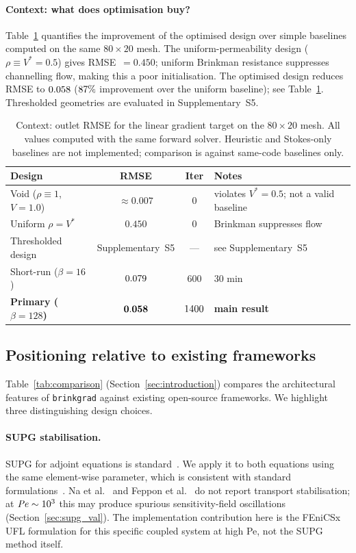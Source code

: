\paragraph{Context: what does optimisation buy?}
Table~\ref{tab:context} quantifies the improvement of the
optimised design over simple baselines computed on the
same $80\times20$ mesh.
The uniform-permeability design ($\rho\equiv V^*=0.5$)
gives RMSE~$=0.450$; uniform Brinkman resistance suppresses
channelling flow, making this a poor initialisation.
The optimised design reduces RMSE to $0.058$
($87\%$ improvement over the uniform baseline);
see Table~\ref{tab:context}.
Thresholded geometries are evaluated in Supplementary~S5.

\begin{table}[h]
\centering\small
\caption{Context: outlet RMSE for the linear gradient target
         on the $80\times20$ mesh.
         All values computed with the same forward solver.
         Heuristic and Stokes-only baselines are not implemented;
         comparison is against same-code baselines only.}
\label{tab:context}
\begin{tabular}{@{}lccp{4.5cm}@{}}
\toprule
Design & RMSE & Iter & Notes \\
\midrule
Void ($\rho\equiv1$, $V=1.0$) & $\approx0.007$ & 0 & violates $V^*=0.5$; not a valid baseline \\
Uniform $\rho=V^*$ & $0.450$ & 0 & Brinkman suppresses flow \\
Thresholded design & Supplementary~S5 & --- & see Supplementary~S5 \\
Short-run ($\beta=16$) & $0.079$ & 600 & 30 min \\
\textbf{Primary ($\beta=128$)} & $\mathbf{0.058}$ & $1400$ & \textbf{main result} \\
\bottomrule
\end{tabular}
\end{table}

\subsection{Positioning relative to existing frameworks}
\label{sec:positioning}
Table~\ref{tab:comparison} (Section~\ref{sec:introduction}) compares
the architectural features of \texttt{brinkgrad} against existing
open-source frameworks.
We highlight three distinguishing design choices.

\paragraph{SUPG stabilisation.}
SUPG for adjoint equations is standard~\cite{donea2003,giles2000}.
We apply it to both equations using the same element-wise parameter,
which is consistent with standard formulations~\cite{brooks1982}.
Na et al.~\cite{na2022} and Feppon et al.~\cite{feppon2024}
do not report transport stabilisation; at $\mathit{Pe}\sim10^3$
this may produce spurious sensitivity-field oscillations
(Section~\ref{sec:supg_val}).
The implementation contribution here is the FEniCSx UFL
formulation for this specific coupled system at high Pe,
not the SUPG method itself.

